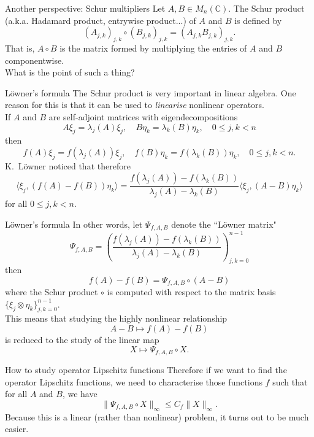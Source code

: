 \documentclass{beamer}
\numberwithin{equation}{section}
\theoremstyle{plain}
\theoremstyle{plain}
\theoremstyle{definition}
\theoremstyle{plain}
\theoremstyle{plain}
\theoremstyle{definition}
\newcommand{\Cplx}{\mathbb{C}}
\begin{document}
\begin{frame}{Another perspective: Schur multipliers}
    Let $A,B \in M_n(\Cplx).$ The Schur product (a.k.a. Hadamard product, entrywise product...) of $A$ and $B$ is defined by
    \[
        (A_{j,k})_{j,k}\circ (B_{j,k})_{j,k} = (A_{j,k}B_{j,k})_{j,k}.
    \]
    \pause
    That is, $A\circ B$ is the matrix formed by multiplying the entries of $A$ and $B$ componentwise.\\

    What is the point of such a thing?
\end{frame}


\begin{frame}{L\"{o}wner's formula}
    The Schur product is very important in linear algebra. One reason for this is that it can be used to \emph{linearise}
    nonlinear operators.\\ \pause
    If $A$ and $B$ are self-adjoint matrices with eigendecompositions
    \[
        A\xi_j= \lambda_j(A)\xi_j,\quad B\eta_k = \lambda_k(B)\eta_k,\quad 0\leq j,k < n
    \]
    then
    \[
        f(A)\xi_j = f(\lambda_j(A))\xi_j,\quad f(B)\eta_k = f(\lambda_k(B))\eta_k,\quad 0\leq j,k < n.
    \]
    K.~L\"owner noticed that therefore
    \[
        \langle \xi_j,(f(A)-f(B))\eta_k\rangle =  \frac{f(\lambda_j(A))-f(\lambda_k(B))}{\lambda_j(A)-\lambda_k(B)}\langle \xi_j,(A-B)\eta_k\rangle
    \]
    for all $0\leq j,k < n.$
\end{frame}

\begin{frame}{L\"{o}wner's formula}
    In other words, let $\Psi_{f,A,B}$ denote the ``L\"{o}wner matrix"
    \[
        \Psi_{f,A,B} = \left(\frac{f(\lambda_j(A))-f(\lambda_k(B))}{\lambda_j(A)-\lambda_k(B)}\right)_{j,k=0}^{n-1}
    \]
    then
    \[
        f(A)-f(B) = \Psi_{f,A,B} \circ (A-B)
    \]
    where the Schur product $\circ$ is computed with respect to the matrix basis $\{\xi_j\otimes \eta_k\}_{j,k=0}^{n-1}.$\\
    \pause
    This means that studying the highly nonlinear relationship
    \[
        A-B \mapsto f(A)-f(B)
    \]
    is reduced to the study of the linear map
    \[
        X\mapsto \Psi_{f,A,B}\circ X.
    \]
\end{frame}

\begin{frame}{How to study operator Lipschitz functions}
    Therefore if we want to find the operator Lipschitz functions, we need to characterise
    those functions $f$ such that for all $A$ and $B$, we have
    \[
        \|\Psi_{f,A,B}\circ X \|_{\infty} \leq C_f\|X\|_{\infty}.
    \]
    Because this is a linear (rather than nonlinear) problem, it turns out to be much easier.
\end{frame}
\end{document}
